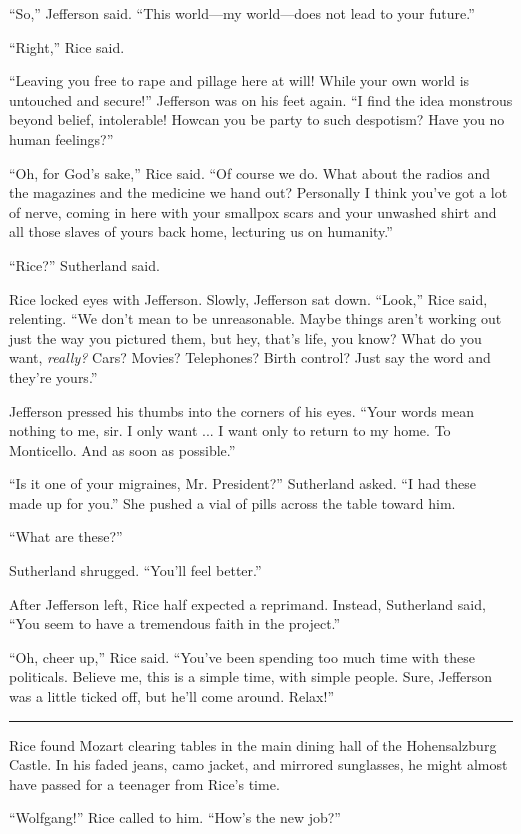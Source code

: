 ``So,'' Jefferson said. ``This world—my world—does not lead to your future.''

``Right,'' Rice said.

``Leaving you free to rape and pillage here at will! While your own world is untouched and secure!'' Jefferson was on his feet again. ``I find the idea monstrous beyond belief, intolerable! Howcan you be party to such despotism? Have you no human feelings?''

``Oh, for God's sake,'' Rice said. ``Of course we do. What about the radios and the magazines and the medicine we hand out? Personally I think you've got a lot of nerve, coming in here with your smallpox scars and your unwashed shirt and all those slaves of yours back home, lecturing us on humanity.''

``Rice?'' Sutherland said.

Rice locked eyes with Jefferson. Slowly, Jefferson sat down. ``Look,'' Rice said, relenting. ``We don't mean to be unreasonable. Maybe things aren't working out just the way you pictured them, but hey, that's life, you know? What do you want, \textit{really?} Cars? Movies? Telephones? Birth control? Just say the word and they're yours.''

Jefferson pressed his thumbs into the corners of his eyes. ``Your words mean nothing to me, sir. I only want ... I want only to return to my home. To Monticello. And as soon as possible.''

``Is it one of your migraines, Mr. President?'' Sutherland asked. ``I had these made up for you.'' She pushed a vial of pills across the table toward him.

``What are these?''

Sutherland shrugged. ``You'll feel better.''

After Jefferson left, Rice half expected a reprimand. Instead, Sutherland said, ``You seem to have a tremendous faith in the project.''

``Oh, cheer up,'' Rice said. ``You've been spending too much time with these politicals. Believe me, this is a simple time, with simple people. Sure, Jefferson was a little ticked off, but he'll come around. Relax!''

\fancybreak{* * *}

Rice found Mozart clearing tables in the main dining hall of the Hohensalzburg Castle. In his faded jeans, camo jacket, and mirrored sunglasses, he might almost have passed for a teenager from Rice's time.

``Wolfgang!'' Rice called to him. ``How's the new job?''

